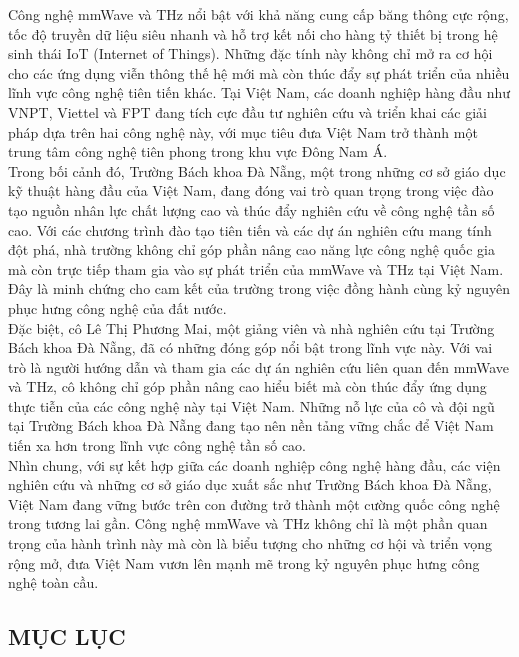 \documentclass[a4paper,13pt]{article}
\begin{document}
Công nghệ mmWave và THz nổi bật với khả năng cung cấp băng thông cực rộng, tốc độ truyền dữ liệu siêu nhanh và hỗ trợ kết nối cho hàng tỷ thiết bị trong hệ sinh thái IoT (Internet of Things). Những đặc tính này không chỉ mở ra cơ hội cho các ứng dụng viễn thông thế hệ mới mà còn thúc đẩy sự phát triển của nhiều lĩnh vực công nghệ tiên tiến khác. Tại Việt Nam, các doanh nghiệp hàng đầu như VNPT, Viettel và FPT đang tích cực đầu tư nghiên cứu và triển khai các giải pháp dựa trên hai công nghệ này, với mục tiêu đưa Việt Nam trở thành một trung tâm công nghệ tiên phong trong khu vực Đông Nam Á.\\

Trong bối cảnh đó, Trường Bách khoa Đà Nẵng, một trong những cơ sở giáo dục kỹ thuật hàng đầu của Việt Nam, đang đóng vai trò quan trọng trong việc đào tạo nguồn nhân lực chất lượng cao và thúc đẩy nghiên cứu về công nghệ tần số cao. Với các chương trình đào tạo tiên tiến và các dự án nghiên cứu mang tính đột phá, nhà trường không chỉ góp phần nâng cao năng lực công nghệ quốc gia mà còn trực tiếp tham gia vào sự phát triển của mmWave và THz tại Việt Nam. Đây là minh chứng cho cam kết của trường trong việc đồng hành cùng kỷ nguyên phục hưng công nghệ của đất nước.\\

Đặc biệt, cô Lê Thị Phương Mai, một giảng viên và nhà nghiên cứu tại Trường Bách khoa Đà Nẵng, đã có những đóng góp nổi bật trong lĩnh vực này. Với vai trò là người hướng dẫn và tham gia các dự án nghiên cứu liên quan đến mmWave và THz, cô không chỉ góp phần nâng cao hiểu biết mà còn thúc đẩy ứng dụng thực tiễn của các công nghệ này tại Việt Nam. Những nỗ lực của cô và đội ngũ tại Trường Bách khoa Đà Nẵng đang tạo nên nền tảng vững chắc để Việt Nam tiến xa hơn trong lĩnh vực công nghệ tần số cao.\\

Nhìn chung, với sự kết hợp giữa các doanh nghiệp công nghệ hàng đầu, các viện nghiên cứu và những cơ sở giáo dục xuất sắc như Trường Bách khoa Đà Nẵng, Việt Nam đang vững bước trên con đường trở thành một cường quốc công nghệ trong tương lai gần. Công nghệ mmWave và THz không chỉ là một phần quan trọng của hành trình này mà còn là biểu tượng cho những cơ hội và triển vọng rộng mở, đưa Việt Nam vươn lên mạnh mẽ trong kỷ nguyên phục hưng công nghệ toàn cầu.
\clearpage  

\begin{center}
\section{MỤC LỤC}
\end{center}
\end{document}
